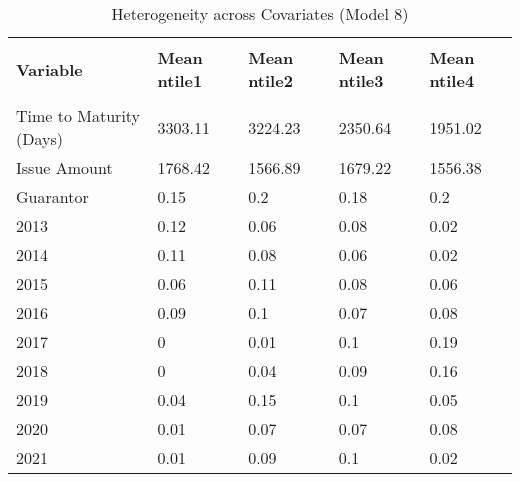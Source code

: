 \begin{table}[H]
\caption{Heterogeneity across Covariates (Model 8)}
\label{Het}
\footnotesize
\begin{tabular}{lllll}
\\[-1.8ex]\hline 
\hline \\[-1.8ex] 
{\color[HTML]{333333} \textbf{Variable}} & {\color[HTML]{333333} \textbf{Mean ntile1}} & {\color[HTML]{333333} \textbf{Mean ntile2}} & {\color[HTML]{333333} \textbf{Mean ntile3}} & {\color[HTML]{333333} \textbf{Mean ntile4}} \\
\hline \\[-1.8ex] 
Time to   Maturity (Days) & \cellcolor[HTML]{63BE7B}3303.11 & \cellcolor[HTML]{6CC283}3224.23 & \cellcolor[HTML]{CFEAD8}2350.64 & \cellcolor[HTML]{FCFCFF}1951.02 \\
Issue Amount & \cellcolor[HTML]{63BE7B}1768.42 & \cellcolor[HTML]{F5F9F9}1566.89 & \cellcolor[HTML]{A4D9B3}1679.22 & \cellcolor[HTML]{FCFCFF}1556.38 \\
Guarantor & \cellcolor[HTML]{E5F3EB}0.15 & \cellcolor[HTML]{DEF0E5}0.2 & \cellcolor[HTML]{E1F1E7}0.18 & \cellcolor[HTML]{DEF0E5}0.2 \\
2013 & \cellcolor[HTML]{EAF5EF}0.12 & \cellcolor[HTML]{F3F9F7}0.06 & \cellcolor[HTML]{F0F7F5}0.08 & \cellcolor[HTML]{F9FBFD}0.02 \\
2014 & \cellcolor[HTML]{EBF6F1}0.11 & \cellcolor[HTML]{F0F7F5}0.08 & \cellcolor[HTML]{F3F9F7}0.06 & \cellcolor[HTML]{F9FBFD}0.02 \\
2015 & \cellcolor[HTML]{F3F9F7}0.06 & \cellcolor[HTML]{EBF6F1}0.11 & \cellcolor[HTML]{F0F7F5}0.08 & \cellcolor[HTML]{F3F9F7}0.06 \\
2016 & \cellcolor[HTML]{EFF7F3}0.09 & \cellcolor[HTML]{EDF6F2}0.1 & \cellcolor[HTML]{F2F8F6}0.07 & \cellcolor[HTML]{F0F7F5}0.08 \\
2017 & \cellcolor[HTML]{FCFCFF}0 & \cellcolor[HTML]{FBFCFE}0.01 & \cellcolor[HTML]{EDF6F2}0.1 & \cellcolor[HTML]{DFF1E6}0.19 \\
2018 & \cellcolor[HTML]{FCFCFF}0 & \cellcolor[HTML]{F6FAFA}0.04 & \cellcolor[HTML]{EFF7F3}0.09 & \cellcolor[HTML]{E4F2EA}0.16 \\
2019 & \cellcolor[HTML]{F6FAFA}0.04 & \cellcolor[HTML]{E5F3EB}0.15 & \cellcolor[HTML]{EDF6F2}0.1 & \cellcolor[HTML]{F5F9F9}0.05 \\
2020 & \cellcolor[HTML]{FBFCFE}0.01 & \cellcolor[HTML]{F2F8F6}0.07 & \cellcolor[HTML]{F2F8F6}0.07 & \cellcolor[HTML]{F0F7F5}0.08 \\
2021 & \cellcolor[HTML]{FBFCFE}0.01 & \cellcolor[HTML]{EFF7F3}0.09 & \cellcolor[HTML]{EDF6F2}0.1 & \cellcolor[HTML]{F9FBFD}0.02 \\

\end{tabular}
\end{table}
